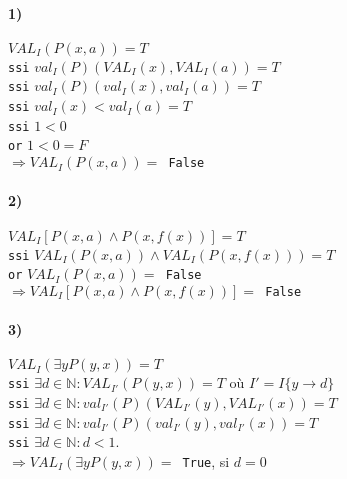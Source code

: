     {\setlength{\baselineskip}{1.3\baselineskip} %
    
    \paragraph{1)}

    $VAL_I(P(x,a)) = T$
    \\
    \texttt{ssi} $val_I(P)(VAL_I(x),VAL_I(a)) = T$
    \\
    \texttt{ssi} $val_I(P)(val_I(x),val_I(a)) = T$
    \\
    \texttt{ssi} $val_I(x) < val_{I}(a) = T$
    \\
    \texttt{ssi} $1<0$    
    \\
    \texttt{or} $1<0 = F$
    \\
    $\Rightarrow VAL_I(P(x,a)) = $\texttt{ False} 
    
    \paragraph{2)}


    $VAL_I[P(x,a) \land P(x, f(x))] = T$
    \\
    \texttt{ssi} $VAL_I(P(x,a)) \land VAL_I(P(x,f(x))) = T$
    \\
    \texttt{or} $VAL_I(P(x,a)) = $\texttt{ False} 
    \\
    $\Rightarrow VAL_I[P(x,a) \land P(x, f(x))] = $\texttt{ False} 

    \paragraph{3)}
    
    
    $VAL_I(\exists y P(y,x)) = T$
    \\
    \texttt{ssi} $\exists d\in \mathbb{N}: VAL_{I'}(P(y,x)) = T$ où $I' = I\{y\rightarrow d\}$
    \\
    \texttt{ssi} $\exists d\in \mathbb{N}: val_{I'}(P)(VAL_{I'}(y),VAL_{I'}(x)) = T$
    \\
    \texttt{ssi} $\exists d\in \mathbb{N}: val_{I'}(P)(val_{I'}(y),val_{I'}(x)) = T$ 
    \\
    \texttt{ssi} $\exists d\in \mathbb{N}: d < 1$. 
    \\
    $\Rightarrow VAL_I(\exists y P(y,x)) = $\texttt{ True}, si $d=0$
    

}
